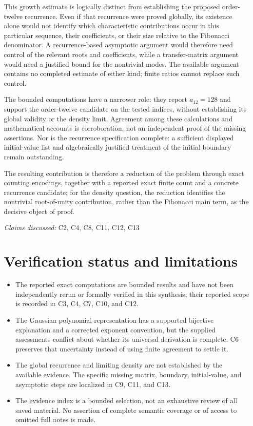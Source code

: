 \documentclass[11pt]{article}
\begin{document}
This growth estimate is logically distinct from establishing the proposed order-twelve recurrence. Even if that recurrence were proved globally, its existence alone would not identify which characteristic contributions occur in this particular sequence, their coefficients, or their size relative to the Fibonacci denominator. A recurrence-based asymptotic argument would therefore need control of the relevant roots and coefficients, while a transfer-matrix argument would need a justified bound for the nontrivial modes. The available argument contains no completed estimate of either kind; finite ratios cannot replace such control.

The bounded computations have a narrower role: they report $a_{12}=128$ and support the order-twelve candidate on the tested indices, without establishing its global validity or the density limit. Agreement among these calculations and mathematical accounts is corroboration, not an independent proof of the missing assertions. Nor is the recurrence specification complete: a sufficient displayed initial-value list and algebraically justified treatment of the initial boundary remain outstanding.

The resulting contribution is therefore a reduction of the problem through exact counting encodings, together with a reported exact finite count and a concrete recurrence candidate; for the density question, the reduction identifies the nontrivial root-of-unity contribution, rather than the Fibonacci main term, as the decisive object of proof.

\textit{Claims discussed: }C2, C4, C8, C11, C12, C13
\section{Verification status and limitations}
\begin{itemize}
\item The reported exact computations are bounded results and have not been independently rerun or formally verified in this synthesis; their reported scope is recorded in C3, C4, C7, C10, and C12.
\item The Gaussian-polynomial representation has a supported bijective explanation and a corrected exponent convention, but the supplied assessments conflict about whether its universal derivation is complete. C6 preserves that uncertainty instead of using finite agreement to settle it.
\item The global recurrence and limiting density are not established by the available evidence. The specific missing matrix, boundary, initial-value, and asymptotic steps are localized in C9, C11, and C13.
\item The evidence index is a bounded selection, not an exhaustive review of all saved material. No assertion of complete semantic coverage or of access to omitted full notes is made.
\end{itemize}
\end{document}
